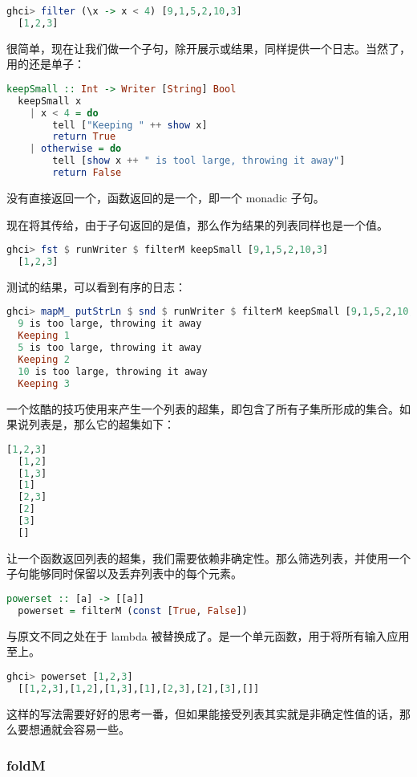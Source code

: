 \documentclass[./main.tex]{subfiles}
\begin{document}
\begin{lstlisting}[language=Haskell]
  ghci> filter (\x -> x < 4) [9,1,5,2,10,3]
  [1,2,3]
\end{lstlisting}

很简单，现在让我们做一个子句，除开展示或结果，同样提供一个日志。当然了，用的还是单子：

\begin{lstlisting}[language=Haskell]
  keepSmall :: Int -> Writer [String] Bool
  keepSmall x
    | x < 4 = do
        tell ["Keeping " ++ show x]
        return True
    | otherwise = do
        tell [show x ++ " is tool large, throwing it away"]
        return False
\end{lstlisting}

没有直接返回一个，函数返回的是一个，即一个 monadic 子句。

现在将其传给，由于子句返回的是值，那么作为结果的列表同样也是一个值。

\begin{lstlisting}[language=Haskell]
  ghci> fst $ runWriter $ filterM keepSmall [9,1,5,2,10,3]
  [1,2,3]
\end{lstlisting}

测试的结果，可以看到有序的日志：

\begin{lstlisting}[language=Haskell]
  ghci> mapM_ putStrLn $ snd $ runWriter $ filterM keepSmall [9,1,5,2,10,3]
  9 is too large, throwing it away
  Keeping 1
  5 is too large, throwing it away
  Keeping 2
  10 is too large, throwing it away
  Keeping 3
\end{lstlisting}

一个炫酷的技巧使用来产生一个列表的超集，即包含了所有子集所形成的集合。如果说列表是\acode{[1,2,3]}，那么它的超集如下：

\begin{lstlisting}[language=Haskell]
  [1,2,3]
  [1,2]
  [1,3]
  [1]
  [2,3]
  [2]
  [3]
  []
\end{lstlisting}

让一个函数返回列表的超集，我们需要依赖非确定性。那么筛选列表，并使用一个子句能够同时保留以及丢弃列表中的每个元素。

\begin{lstlisting}[language=Haskell]
  powerset :: [a] -> [[a]]
  powerset = filterM (const [True, False])
\end{lstlisting}

与原文不同之处在于 lambda 被替换成了。是一个单元函数，用于将所有输入应用至上。

\begin{lstlisting}[language=Haskell]
  ghci> powerset [1,2,3]
  [[1,2,3],[1,2],[1,3],[1],[2,3],[2],[3],[]]
\end{lstlisting}

这样的写法需要好好的思考一番，但如果能接受列表其实就是非确定性值的话，那么要想通就会容易一些。

\subsubsection*{foldM}

\end{document}
